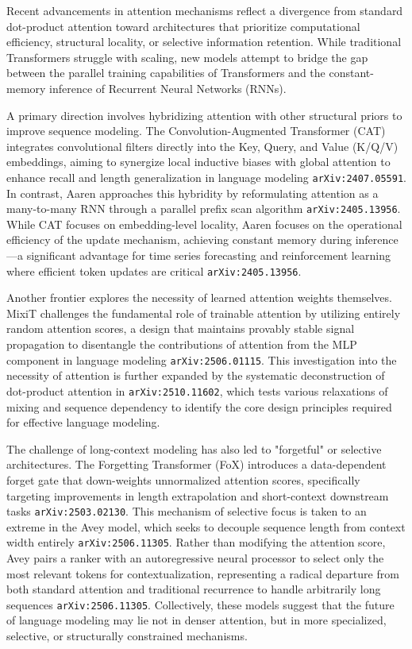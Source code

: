 \documentclass[11pt]{article}
\begin{document}
Recent advancements in attention mechanisms reflect a divergence from standard dot-product attention toward architectures that prioritize computational efficiency, structural locality, or selective information retention. While traditional Transformers struggle with scaling, new models attempt to bridge the gap between the parallel training capabilities of Transformers and the constant-memory inference of Recurrent Neural Networks (RNNs).

A primary direction involves hybridizing attention with other structural priors to improve sequence modeling. The Convolution-Augmented Transformer (CAT) integrates convolutional filters directly into the Key, Query, and Value (K/Q/V) embeddings, aiming to synergize local inductive biases with global attention to enhance recall and length generalization in language modeling \texttt{arXiv:2407.05591}. In contrast, Aaren approaches this hybridity by reformulating attention as a many-to-many RNN through a parallel prefix scan algorithm \texttt{arXiv:2405.13956}. While CAT focuses on embedding-level locality, Aaren focuses on the operational efficiency of the update mechanism, achieving constant memory during inference—a significant advantage for time series forecasting and reinforcement learning where efficient token updates are critical \texttt{arXiv:2405.13956}.

Another frontier explores the necessity of learned attention weights themselves. MixiT challenges the fundamental role of trainable attention by utilizing entirely random attention scores, a design that maintains provably stable signal propagation to disentangle the contributions of attention from the MLP component in language modeling \texttt{arXiv:2506.01115}. This investigation into the necessity of attention is further expanded by the systematic deconstruction of dot-product attention in \texttt{arXiv:2510.11602}, which tests various relaxations of mixing and sequence dependency to identify the core design principles required for effective language modeling.

The challenge of long-context modeling has also led to "forgetful" or selective architectures. The Forgetting Transformer (FoX) introduces a data-dependent forget gate that down-weights unnormalized attention scores, specifically targeting improvements in length extrapolation and short-context downstream tasks \texttt{arXiv:2503.02130}. This mechanism of selective focus is taken to an extreme in the Avey model, which seeks to decouple sequence length from context width entirely \texttt{arXiv:2506.11305}. Rather than modifying the attention score, Avey pairs a ranker with an autoregressive neural processor to select only the most relevant tokens for contextualization, representing a radical departure from both standard attention and traditional recurrence to handle arbitrarily long sequences \texttt{arXiv:2506.11305}. Collectively, these models suggest that the future of language modeling may lie not in denser attention, but in more specialized, selective, or structurally constrained mechanisms.
\end{document}
